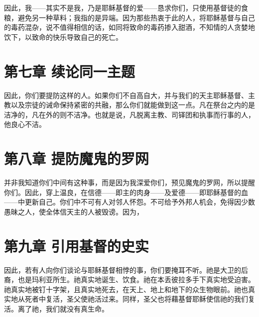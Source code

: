 因此，我——其实不是我，乃是耶稣基督的爱——恳求你们，只使用基督徒的食粮，避免另一种草料；我指的是异端。因为那些热衷于此的人，将耶稣基督与自己的毒药混杂，说不值得相信的话，如同将致命的毒药掺入甜酒，不知情的人贪婪地饮下，以致命的快乐导致自己的死亡。\par


\section{第七章 续论同一主题}

因此，你们要提防这样的人。如果你们不自高自大，并与我们的天主耶稣基督、主教以及宗徒的诫命保持紧密的共融，那么你们就能做到这一点。凡在祭台之内的是洁净的，凡在外的则不洁净。也就是说，凡脱离主教、司铎团和执事而行事的人，他良心不洁。\par


\section{第八章 提防魔鬼的罗网}

并非我知道你们中间有这种事，而是因为我深爱你们，预见魔鬼的罗网，所以提醒你们。因此，穿上温良，在信德——即主的肉身——及爱德——即耶稣基督的血——中更新自己。你们中不可有人对邻人怀怨。不可给予外邦人机会，免得因少数愚昧之人，使全体信天主的人被毁谤。因为， \par


\section{第九章 引用基督的史实}

因此，若有人向你们谈论与耶稣基督相悖的事，你们要掩耳不听。祂是大卫的后裔，也是玛利亚所生。祂真实地诞生、饮食。祂在本丢彼拉多手下真实地受迫害。祂真实地被钉十字架，且真实地死去，在天上、地上和地下的众生物眼前。祂也真实地从死者中复活，圣父使祂活过来。同样，圣父也将藉基督耶稣使信祂的我们复活。离了祂，我们就没有真生命。\par


